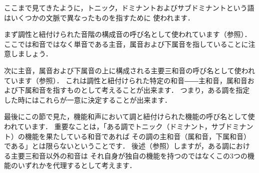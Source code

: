 \documentclass[dvipdfmx,uplatex,b5paper,openany,jbase=12Q,nomag*,textwidth-limit=44%
               ]{gachimuchi}[2020/05/05]
\begin{document}
\begin{NB}
ここまで見てきたように，トニック，ドミナントおよびサブドミナントという語はいくつかの文脈で異なったものを指すために
使われます．

まず調性と紐付けられた音階の構成音の呼び名として使われています（参照）．
ここでは和音ではなく単音である主音，属音および下属音を指していることに注意しましょう．

次に主音，属音および下属音の上に構成される主要三和音の呼び名として使われています（参照）．
これは調性と紐付けられた特定の和音――主和音，属和音および下属和音を指すものとして考えることが出来ます．
つまり，ある調を指定した時にはこれらが一意に決定することが出来ます．

最後にこの節で見た，機能和声において調と紐付けられた機能の呼び名として使われています．
重要なことは，「ある調でトニック（ドミナント，サブドミナント）の機能を果たしている和音であれば
その調の主和音（属和音，下属和音）である」とは限らないということです．
後述（参照）しますが，ある調における主要三和音以外の和音は
それ自身が独自の機能を持つのではなくこの3つの機能のいずれかを代理するとして考えます．
\end{NB}

\end{document}
